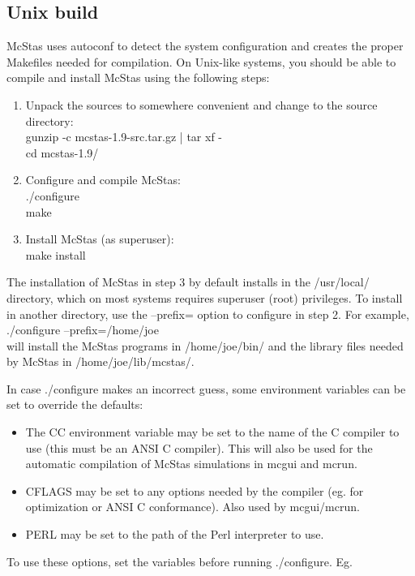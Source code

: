 \subsection{Unix build}
\label{s:build}
McStas uses autoconf to detect the system configuration and creates the
proper Makefiles needed for compilation. On Unix-like systems, you
should be able to compile and install McStas using the following steps:
\begin{enumerate}
\item{Unpack the sources to somewhere convenient and change to the
    source directory:\\
  gunzip -c mcstas-1.9-src.tar.gz | tar xf -\\
  cd mcstas-1.9/}
\item{Configure and compile McStas:\\
  ./configure\\
  make}
\item{Install McStas (as superuser):\\
  make install}
\end{enumerate}

\noindent The installation of McStas in step 3 by default installs in the
/usr/local/ directory, which on most systems requires superuser (root)
privileges. To install in another directory, use the --prefix= option to
configure in step 2. For example,\\

  ./configure --prefix=/home/joe\\

\noindent will install the McStas programs in /home/joe/bin/ and the
library files needed by McStas in /home/joe/lib/mcstas/.

In case ./configure makes an incorrect guess, some environment variables
can be set to override the defaults:
\begin{itemize}
\item{The CC environment variable may be set to the name of the C compiler
   to use (this must be an ANSI C compiler). This will also be used for
   the automatic compilation of McStas simulations in mcgui and
   mcrun.}
\item{CFLAGS may be set to any options needed by the compiler (eg. for
   optimization or ANSI C conformance). Also used by mcgui/mcrun.}
\item{PERL may be set to the path of the Perl interpreter to use.}
\end{itemize}
\noindent To use these options, set the variables before running ./configure. Eg.\\

